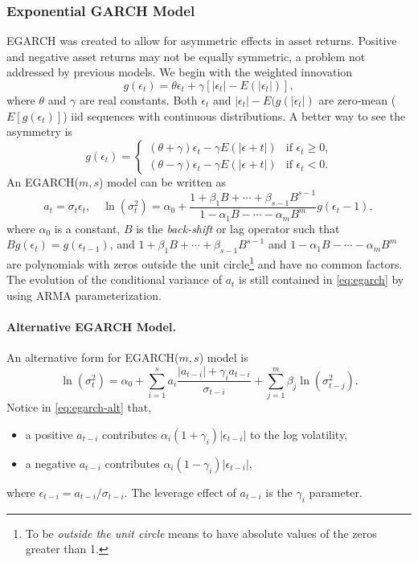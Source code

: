 \subsubsection{Exponential GARCH Model}
EGARCH was created to allow for asymmetric effects in asset returns. Positive and negative asset returns may not be equally symmetric, a problem not addressed by previous models. We begin with the weighted innovation
\[
g(\epsilon_t) = \theta \epsilon_t + \gamma \left[ |\epsilon_t| - E(|\epsilon_t|) \right],
\]
where $\theta$ and $\gamma$ are real constants. Both $\epsilon_t$ and $|\epsilon_t|-E(g(|\epsilon_t|)$ are zero-mean ($E[g(\epsilon_t)]$) iid sequences with continuous distributions. A better way to see the asymmetry is
\[
g(\epsilon_t) =
	\begin{cases}
	(\theta + \gamma)\epsilon_t - \gamma E(|\epsilon+t |) & \text{if $\epsilon_t \ge 0$,} \\
	(\theta - \gamma)\epsilon_t - \gamma E(|\epsilon+t |) & \text{if $\epsilon_t < 0$}.
	\end{cases}
\]
An EGARCH($m,s$) model can be written as
\begin{equation}
a_t = \sigma_t \epsilon_t, \quad \ln(\sigma^2_t)=\alpha_0 +
\frac{1+\beta_1 B+ \cdots +\beta_{s-1} B^{s-1}}{1-\alpha_1 B -\cdots -\alpha_m B^m} g(\epsilon_t - 1),
\label{eq:egarch}
\end{equation}
where $\alpha_0$ is a constant, $B$ is the \emph{back-shift} or lag operator such that $Bg(\epsilon_t)=g(\epsilon_{t-1})$, and $1+\beta_1 B +\cdots +\beta_{s-1} B^{s-1}$ and $1-\alpha_1 B -\cdots -\alpha_m B^m$ are polynomials with zeros outside the unit circle\footnote{To be \emph{outside the unit circle} means to have absolute values of the zeros greater than 1.} and have no common factors. The evolution of the conditional variance of $a_t$ is still contained in \eqref{eq:egarch} by using ARMA parameterization.

\paragraph{Alternative EGARCH Model.} An alternative form for EGARCH($m,s$) model is
\begin{equation}
\ln(\sigma^2_t) = \alpha_0 + \sum^s_{i=1} a_i \frac{|a_{t-i}|+\gamma_i a_{t-i}}{\sigma_{t-i}} +
\sum^m_{j=1} \beta_j \ln(\sigma^2_{t-j}).
\label{eq:egarch-alt}
\end{equation}
Notice in \eqref{eq:egarch-alt} that,
\begin{itemize}
\item a positive $a_{t-i}$ contributes $\alpha_i(1+\gamma_i)|\epsilon_{t-i}|$ to the log volatility,
\item a negative $a_{t-i}$ contributes $\alpha_i(1-\gamma_i)|\epsilon_{t-i}|$,
\end{itemize}
where $\epsilon_{t-i}=a_{t-i}/\sigma_{t-i}$. The leverage effect of $a_{t-i}$ is the $\gamma_i$ parameter.

